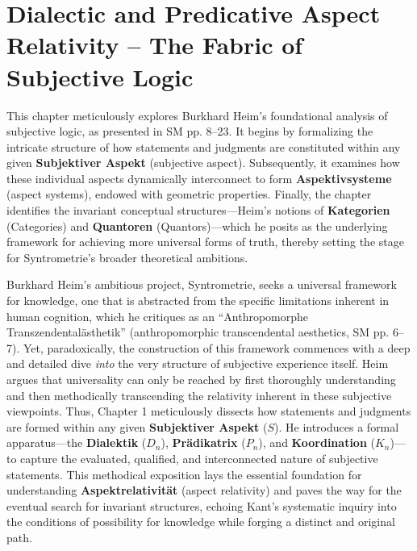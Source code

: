 \documentclass[12pt]{article}
\newcommand{\q}[1]{\enquote{#1}}
\newcommand{\subjektiveraspekt}{S}
\newcommand{\pradikatrix}{P}
\newcommand{\dialektik}{D}
\newcommand{\koordination}{K}
\begin{document}
\section{Dialectic and Predicative Aspect Relativity – The Fabric of Subjective Logic}
\label{sec:chapter1}

This chapter meticulously explores Burkhard Heim's foundational analysis of subjective logic, as presented in SM pp. 8--23. It begins by formalizing the intricate structure of how statements and judgments are constituted within any given \textbf{Subjektiver Aspekt} (subjective aspect). Subsequently, it examines how these individual aspects dynamically interconnect to form \textbf{Aspektivsysteme} (aspect systems), endowed with geometric properties. Finally, the chapter identifies the invariant conceptual structures—Heim's notions of \textbf{Kategorien} (Categories) and \textbf{Quantoren} (Quantors)—which he posits as the underlying framework for achieving more universal forms of truth, thereby setting the stage for Syntrometrie's broader theoretical ambitions.

Burkhard Heim's ambitious project, Syntrometrie, seeks a universal framework for knowledge, one that is abstracted from the specific limitations inherent in human cognition, which he critiques as an \q{Anthropomorphe Transzendental\"{a}sthetik} (anthropomorphic transcendental aesthetics, SM pp. 6--7). Yet, paradoxically, the construction of this framework commences with a deep and detailed dive \textit{into} the very structure of subjective experience itself. Heim argues that universality can only be reached by first thoroughly understanding and then methodically transcending the relativity inherent in these subjective viewpoints. Thus, Chapter 1 meticulously dissects how statements and judgments are formed within any given \textbf{Subjektiver Aspekt} (\(\subjektiveraspekt\)). He introduces a formal apparatus—the \textbf{Dialektik} (\(\dialektik_n\)), \textbf{Pr\"{a}dikatrix} (\(\pradikatrix_n\)), and \textbf{Koordination} (\(\koordination_n\))—to capture the evaluated, qualified, and interconnected nature of subjective statements. This methodical exposition lays the essential foundation for understanding \textbf{Aspektrelativit\"{a}t} (aspect relativity) and paves the way for the eventual search for invariant structures, echoing Kant’s systematic inquiry into the conditions of possibility for knowledge while forging a distinct and original path.
\end{document}
